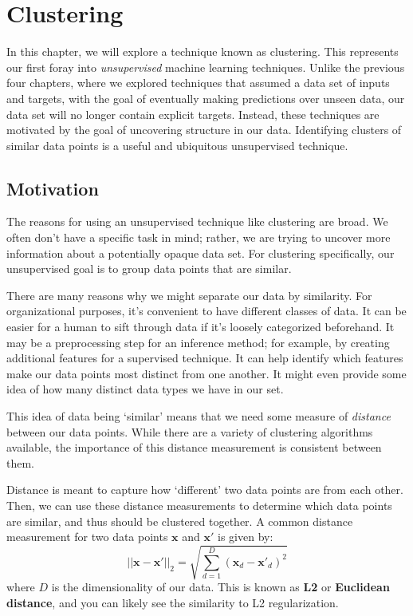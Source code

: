 \chapter{Clustering}
In this chapter, we will explore a technique known as clustering. This represents our first foray into \textit{unsupervised} machine learning techniques. Unlike the previous four chapters, where we explored techniques that assumed a data set of inputs and targets, with the goal of eventually making predictions over unseen data, our data set will no longer contain explicit targets. Instead, these techniques are motivated by the goal of uncovering structure in our data. Identifying clusters of similar data points is a useful and ubiquitous unsupervised technique.

\section{Motivation}
The reasons for using an unsupervised technique like clustering are broad. We often don't have a specific task in mind; rather, we are trying to uncover more information about a potentially opaque data set. For clustering specifically, our unsupervised goal is to group data points that are similar.

There are many reasons why we might separate our data by similarity. For organizational purposes, it's convenient to have different classes of data. It can be easier for a human to sift through data if it's loosely categorized beforehand. It may be a preprocessing step for an inference method; for example, by creating additional features for a supervised technique. It can help identify which features make our data points most distinct from one another. It might even provide some idea of how many distinct data types we have in our set. 

This idea of data being `similar' means that we need some measure of \textit{distance} between our data points. While there are a variety of clustering algorithms available, the importance of this distance measurement is consistent between them.

Distance is meant to capture how `different' two data points are from each other. Then, we can use these distance measurements to determine which data points are similar, and thus should be clustered together. A common distance measurement for two data points $\textbf{x}$ and $\textbf{x}'$ is given by:
\begin{equation} \label{l2-distance}
	|| \textbf{x} - \textbf{x}' ||_{2} = \sqrt{\sum_{d=1}^{D} (\textbf{x}_{d} - \textbf{x}'_{d})^{2}}
\end{equation}
where $D$ is the dimensionality of our data. This is known as \textbf{L2} or \textbf{Euclidean distance}, and you can likely see the similarity to L2 regularization.


